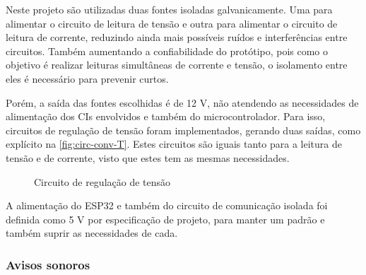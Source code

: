 Neste projeto são utilizadas duas fontes isoladas galvanicamente. Uma para alimentar o circuito de leitura de tensão e outra para alimentar o circuito de leitura de corrente, reduzindo ainda mais possíveis ruídos e interferências entre circuitos. Também aumentando a confiabilidade do protótipo, pois como o objetivo é realizar leituras simultâneas de corrente e tensão, o isolamento entre eles é necessário para prevenir curtos.

Porém, a saída das fontes escolhidas é de 12 V, não atendendo as necessidades de alimentação dos \gls{CI}s envolvidos e também do microcontrolador. Para isso, circuitos de regulação de tensão foram implementados, gerando duas saídas, como explícito na \autoref{fig:circ-conv-T}. Estes circuitos são iguais tanto para a leitura de tensão e de corrente, visto que estes tem as mesmas necessidades.

\begin{figure}[htb!]
    \caption{Circuito de regulação de tensão}
    \label{fig:circ-conv-T}
    \fonte{}
\end{figure}

A alimentação do ESP32 e também do circuito de comunicação isolada foi definida como 5 V por especificação de projeto, para manter um padrão e também suprir as necessidades de cada.

\subsubsection{Avisos sonoros}\label{aviso-sonoro}

